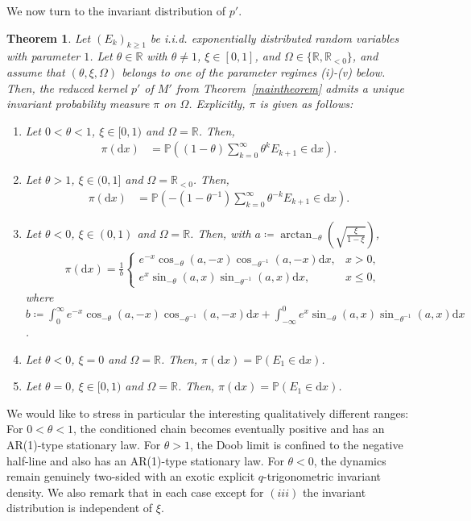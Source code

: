 \documentclass[12pt]{article}
\newcommand{\R}{\mathbb{R}} %
\renewcommand{\P}{\mathbb{P}} %
\newcommand{\1}{\mathds{1}}
\renewcommand{\d}{\mathrm{d}}
\theoremstyle{definition}
\theoremstyle{plain}
\newtheorem{Theorem}[definition]{Theorem}
\theoremstyle{remark}
\begin{document}
We now turn to the invariant distribution of $p'$.
\begin{Theorem}\label{invariant_distribution}
  Let $(E_k)_{k\ge1}$ be i.i.d. exponentially distributed random variables with parameter $1$.    Let $\theta\in\R$ with $\theta\neq1$, $\xi\in[0,1]$, and
$\Omega\in\{\R,\R_{<0}\}$, and assume that
$(\theta,\xi,\Omega)$ belongs to one of the parameter regimes
 (i)-(v) below. Then, the reduced  kernel $p'$ of $M'$ from Theorem~\ref{maintheorem} admits a unique invariant probability measure $\pi$ on $\Omega$.
Explicitly, $\pi$ is given as follows:
    \begin{enumerate}[label=(\roman*)]
     \item  Let $0<\theta<1$, $\xi\in[0,1)$ and $\Omega=\R$. Then, 
     \begin{align}\label{inv_distr_i}
         \pi(\d x) 
         &= \P\left( (1-\theta)\sum_{k=0}^\infty\theta^kE_{k+1} \in\d x \right).
     \end{align}
     \item  Let $\theta>1$, $\xi\in(0,1]$ and $\Omega=\R_{<0}$. Then, 
     \begin{align*}
        \pi(\d x) 
       &= \P\left( -(1-\theta^{-1}) \sum_{k=0}^\infty\theta^{-k}E_{k+1} \in\d x \right).
     \end{align*}
 \item Let $\theta <0$, $\xi\in(0,1)$ and $\Omega=\R$. Then, with $a\coloneqq \arctan_{-\theta}\left(\sqrt{\frac{\xi}{1-\xi}}\right)$,
\begin{align*}
    &\pi(\d x) =\frac{1}{b}
    \begin{cases} e^{-x} \cos_{-\theta}\left(a,-x\right) \cos_{- \theta^{-1}}\left(a,-x\right)\d x, &x>0,\\ e^x \sin_{-\theta}\left(a,x\right) \sin_{- \theta^{-1}}\left(a,x\right)\d x, &x\leq0, \end{cases}
\end{align*}
where $b\!\coloneqq \!\int_0^\infty e^{-x}\! \cos_{-\theta}(a,-x) \cos_{-\theta^{-1}}(a,-x)\d x + \int_{-\infty}^0 e^x \!\sin_{-\theta}(a,x) \sin_{-\theta^{-1}}(a,x)\d x$.
 \item Let $\theta <0$, $\xi=0$ and $\Omega=\R$. Then, 
  $\pi(\d x) =\P(E_1\in\d x)$.
 \item Let $\theta=0$, $\xi\in[0,1)$ and $\Omega=\R$. Then, 
  $\pi(\d x) =\P(E_1\in\d x)$.
\end{enumerate}
\end{Theorem}
    We would like to stress in particular the interesting qualitatively different ranges: For $0<\theta<1$, the conditioned chain becomes eventually positive and has an AR(1)-type stationary law. For $\theta>1$, the Doob limit is confined to the negative half-line and also has an AR(1)-type stationary law. For $\theta<0$, the dynamics remain genuinely two-sided with an exotic explicit $q$-trigonometric invariant density.
    We also remark that in each case except for $(iii)$ the invariant distribution is independent of $\xi$.
\end{document}
